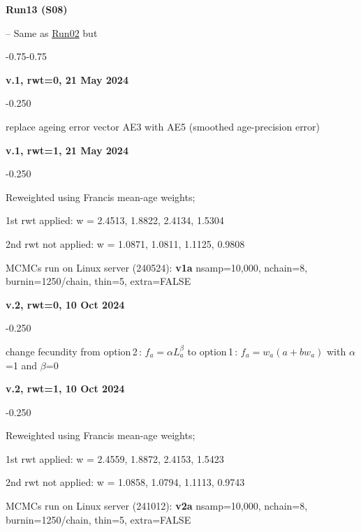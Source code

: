 \hypertarget{R13}{\textbf{Run13 (S08)}} -- Same as \hyperlink{R02}{Run02} but
\begin{itemize_csas}{-0.75}{-0.75}
	\item \textbf{v.1, rwt=0, 21 May 2024}
	\begin{itemize_csas}{-0.25}{0}
		\item replace ageing error vector AE3 with AE5 (smoothed age-precision error)
	\end{itemize_csas}
	\item \textbf{v.1, rwt=1, 21 May 2024}
	\begin{itemize_csas}{-0.25}{0}
		\item Reweighted using Francis mean-age weights;
		\item 1st rwt applied: w = 2.4513, 1.8822, 2.4134, 1.5304
		\item 2nd rwt not applied: w = 1.0871, 1.0811, 1.1125, 0.9808
		\item MCMCs run on Linux server (240524): \textbf{v1a} nsamp=10,000, nchain=8, burnin=1250/chain, thin=5, extra=FALSE
	\end{itemize_csas}
	\item \textbf{v.2, rwt=0, 10 Oct 2024}
	\begin{itemize_csas}{-0.25}{0}
		\item change fecundity from option\,2\,: $f_a = \alpha L_a^{\beta}$ to option\,1\,:  $f_a = w_a (a + b w_a)$ with $\alpha$=1 and $\beta$=0
	\end{itemize_csas}
	\item \textbf{v.2, rwt=1, 10 Oct 2024}
	\begin{itemize_csas}{-0.25}{0}
		\item Reweighted using Francis mean-age weights;
		\item 1st rwt applied: w = 2.4559, 1.8872, 2.4153, 1.5423
		\item 2nd rwt not applied: w = 1.0858, 1.0794, 1.1113, 0.9743
		\item MCMCs run on Linux server (241012): \textbf{v2a} nsamp=10,000, nchain=8, burnin=1250/chain, thin=5, extra=FALSE
	\end{itemize_csas}
\end{itemize_csas}

